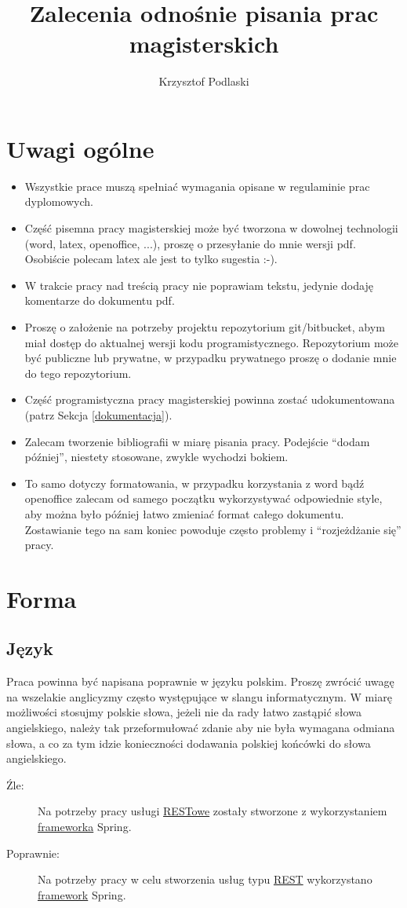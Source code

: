 \documentclass[12pt,a4paper]{article}
\begin{document}
\title{Zalecenia odnośnie pisania prac magisterskich}
\author{Krzysztof Podlaski}
\date{}
\maketitle


\section{Uwagi ogólne}
\begin{itemize}
\item Wszystkie prace muszą spełniać wymagania opisane w regulaminie prac dyplomowych.
\item Część pisemna pracy magisterskiej może być tworzona w dowolnej technologii (word, latex, openoffice, ...), proszę o przesyłanie do mnie wersji pdf. Osobiście polecam latex ale jest to tylko sugestia :-).
\item W trakcie pracy nad treścią pracy nie poprawiam tekstu, jedynie dodaję komentarze do dokumentu pdf.
\item Proszę o założenie na potrzeby projektu repozytorium git/bitbucket, abym miał dostęp do aktualnej wersji kodu programistycznego.  Repozytorium może być publiczne lub prywatne, w przypadku prywatnego proszę o dodanie mnie do tego repozytorium.
\item Część programistyczna pracy magisterskiej powinna zostać udokumentowana (patrz Sekcja \ref{dokumentacja}).
\item Zalecam tworzenie bibliografii w miarę pisania pracy. Podejście ``dodam później'', niestety stosowane, zwykle wychodzi bokiem.
\item To samo dotyczy formatowania, w przypadku korzystania z word bądź openoffice zalecam od samego początku wykorzystywać odpowiednie style, aby można było później łatwo zmieniać format całego dokumentu. Zostawianie tego na sam koniec powoduje często problemy i ``rozjeżdżanie się'' pracy.
\end{itemize}

\section{Forma}

\subsection{Język}
Praca powinna być napisana poprawnie w języku polskim. Proszę zwrócić uwagę na wszelakie anglicyzmy często występujące w slangu informatycznym. W miarę możliwości stosujmy polskie słowa, jeżeli nie da rady łatwo zastąpić słowa angielskiego, należy tak przeformułować zdanie aby nie była wymagana odmiana słowa, a co za tym idzie konieczności dodawania polskiej końcówki do słowa angielskiego.
\begin{description}
  \item[{\color{red}Źle:}] Na potrzeby pracy usługi \underline{RESTowe} zostały stworzone z wykorzystaniem \underline{frameworka} Spring.
  \item[Poprawnie:] Na potrzeby pracy w celu stworzenia usług typu \underline{REST} wykorzystano \underline{framework} Spring.
\end{description}
\end{document}
